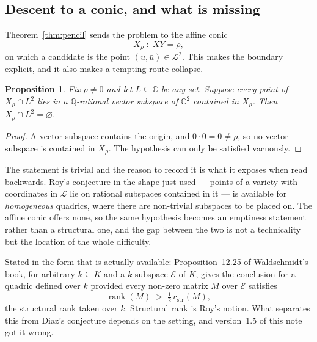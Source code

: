 \documentclass[11pt,a4paper]{article}
\theoremstyle{plain}
\newtheorem{proposition}[theorem]{Proposition}
\theoremstyle{definition}
\newcommand{\C}{\mathbb{C}}
\newcommand{\Q}{\mathbb{Q}}
\newcommand{\Logs}{\mathcal{L}}
\begin{document}
\subsection*{Descent to a conic, and what is missing}

Theorem~\ref{thm:pencil} sends the problem to the affine conic
\[
  X_{\rho}\;:\;XY=\rho ,
\]
on which a candidate is the point $(u,\bar u)\in\Logs^{2}$. This makes the boundary explicit,
and it also makes a tempting route collapse.

\begin{proposition}\label{prop:roy}
Fix $\rho\neq0$ and let $L\subseteq\C$ be any set. Suppose every point of $X_{\rho}\cap L^{2}$
lies in a $\Q$-rational vector subspace of $\C^{2}$ contained in $X_{\rho}$. Then
$X_{\rho}\cap L^{2}=\varnothing$.
\end{proposition}

\begin{proof}
A vector subspace contains the origin, and $0\cdot0=0\neq\rho$, so no vector subspace is
contained in $X_{\rho}$. The hypothesis can only be satisfied vacuously.
\end{proof}

The statement is trivial and the reason to record it is what it exposes when read backwards.
Roy's conjecture in the shape just used --- points of a variety with coordinates in $\Logs$ lie
on rational subspaces contained in it --- is available for \emph{homogeneous} quadrics, where
there are non-trivial subspaces to be placed on. The affine conic offers none, so the same
hypothesis becomes an emptiness statement rather than a structural one, and the gap between the
two is not a technicality but the location of the whole difficulty.

Stated in the form that is actually available: Proposition~12.25 of Waldschmidt's book, for
arbitrary $k\subseteq K$ and a $k$-subspace $\mathcal{E}$ of $K$, gives the conclusion for a
quadric defined over $k$ provided every non-zero matrix $M$ over $\mathcal{E}$ satisfies
\[
  \operatorname{rank}(M)\;>\;\tfrac12\,r_{\mathrm{str}}(M),
\]
the structural rank taken over $k$. Structural rank is Roy's notion. What separates this from
Diaz's conjecture depends on the setting, and version~1.5 of this note got it wrong.
\end{document}
